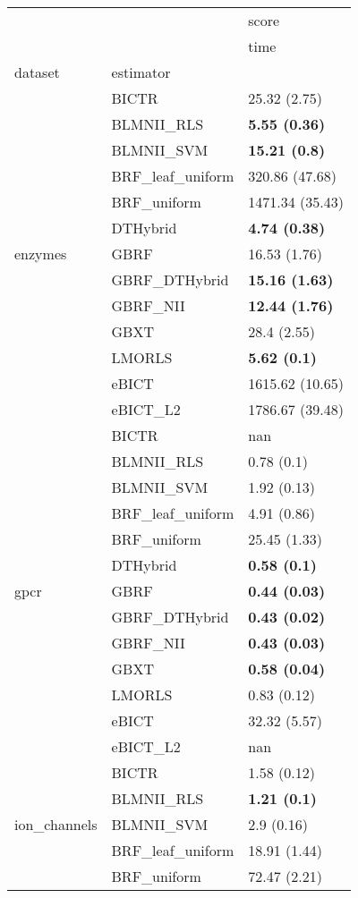\begin{tabular}{lll}
\toprule
 &  & score \\
 &  & time \\
dataset & estimator &  \\
\midrule
\multirow[c]{13}{*}{enzymes} & BICTR & 25.32 (2.75) \\
 & BLMNII\_RLS & \textbf{5.55 (0.36)} \\
 & BLMNII\_SVM & \textbf{15.21 (0.8)} \\
 & BRF\_leaf\_uniform & 320.86 (47.68) \\
 & BRF\_uniform & 1471.34 (35.43) \\
 & DTHybrid & \textbf{4.74 (0.38)} \\
 & GBRF & 16.53 (1.76) \\
 & GBRF\_DTHybrid & \textbf{15.16 (1.63)} \\
 & GBRF\_NII & \textbf{12.44 (1.76)} \\
 & GBXT & 28.4 (2.55) \\
 & LMORLS & \textbf{5.62 (0.1)} \\
 & eBICT & 1615.62 (10.65) \\
 & eBICT\_L2 & 1786.67 (39.48) \\
\cline{1-2}
\multirow[c]{13}{*}{gpcr} & BICTR & nan \\
 & BLMNII\_RLS & 0.78 (0.1) \\
 & BLMNII\_SVM & 1.92 (0.13) \\
 & BRF\_leaf\_uniform & 4.91 (0.86) \\
 & BRF\_uniform & 25.45 (1.33) \\
 & DTHybrid & \textbf{0.58 (0.1)} \\
 & GBRF & \textbf{0.44 (0.03)} \\
 & GBRF\_DTHybrid & \textbf{0.43 (0.02)} \\
 & GBRF\_NII & \textbf{0.43 (0.03)} \\
 & GBXT & \textbf{0.58 (0.04)} \\
 & LMORLS & 0.83 (0.12) \\
 & eBICT & 32.32 (5.57) \\
 & eBICT\_L2 & nan \\
\cline{1-2}
\multirow[c]{13}{*}{ion\_channels} & BICTR & 1.58 (0.12) \\
 & BLMNII\_RLS & \textbf{1.21 (0.1)} \\
 & BLMNII\_SVM & 2.9 (0.16) \\
 & BRF\_leaf\_uniform & 18.91 (1.44) \\
 & BRF\_uniform & 72.47 (2.21) \\

\end{tabular}
